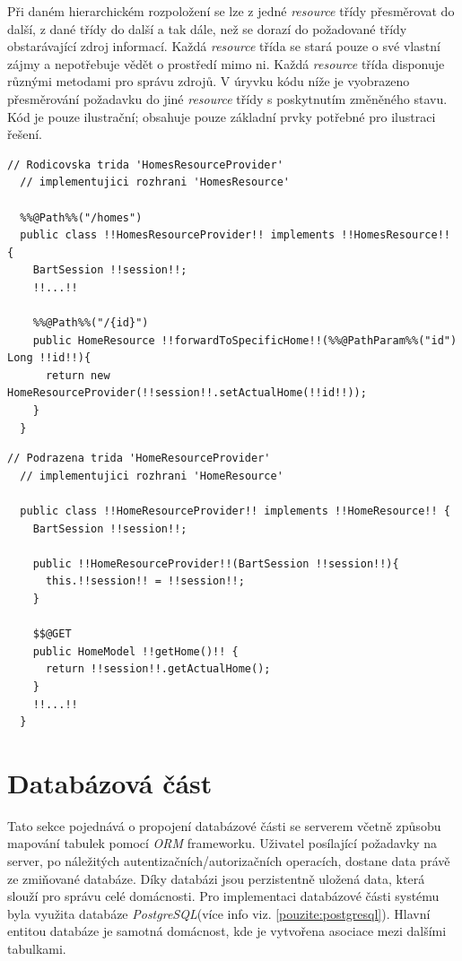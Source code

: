 Při daném hierarchickém rozpoložení se lze z jedné \emph{resource} třídy přesměrovat do další, z dané třídy do další a tak dále, než se dorazí do požadované třídy obstarávající zdroj informací.
Každá \emph{resource} třída se stará pouze o své vlastní zájmy a nepotřebuje vědět o prostředí mimo ni.
Každá \emph{resource} třída disponuje různými metodami pro správu zdrojů.
V úryvku kódu níže je vyobrazeno přesměrování požadavku do jiné \emph{resource} třídy s poskytnutím změněného stavu.
Kód je pouze ilustrační; obsahuje pouze základní prvky potřebné pro ilustraci řešení.
\newpage
\begin{lstlisting}[style=JavaStyle, caption={Ukázka přesměrování požadavku}]
  // Rodicovska trida 'HomesResourceProvider'
  // implementujici rozhrani 'HomesResource'

  %%@Path%%("/homes")
  public class !!HomesResourceProvider!! implements !!HomesResource!! {
    BartSession !!session!!;
    !!...!!

    %%@Path%%("/{id}")
    public HomeResource !!forwardToSpecificHome!!(%%@PathParam%%("id") Long !!id!!){
      return new HomeResourceProvider(!!session!!.setActualHome(!!id!!));
    }
  }
\end{lstlisting}

\begin{lstlisting}[style=JavaStyle, caption={Ukázka zpracování požadavku z přesměrované třídy}]
  // Podrazena trida 'HomeResourceProvider'
  // implementujici rozhrani 'HomeResource'

  public class !!HomeResourceProvider!! implements !!HomeResource!! {
    BartSession !!session!!;

    public !!HomeResourceProvider!!(BartSession !!session!!){
      this.!!session!! = !!session!!;
    }

    $$@GET
    public HomeModel !!getHome()!! {
      return !!session!!.getActualHome();
    }
    !!...!!
  }
\end{lstlisting}

\newpage
\section{Databázová část}
\label{impl:databaze}
Tato sekce pojednává o propojení databázové části se serverem včetně způsobu mapování tabulek pomocí \emph{ORM} frameworku.
Uživatel posílající požadavky na server, po náležitých autentizačních/autorizačních operacích, dostane data právě ze zmiňované databáze.
Díky databázi jsou perzistentně uložená data, která slouží pro správu celé domácnosti.
Pro implementaci databázové části systému byla využita databáze \emph{PostgreSQL}(více info viz. \ref{pouzite:postgresql}).
Hlavní entitou databáze je samotná domácnost, kde je vytvořena asociace mezi dalšími tabulkami.

